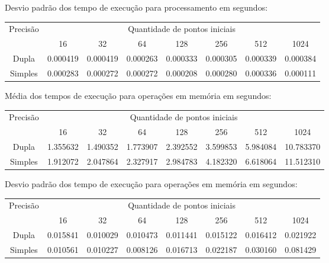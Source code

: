   \newpage
  \begin{small}
  \noindent Desvio padrão dos tempo de execução para processamento em segundos:\\
  \begin{tabular}{| c | c | c | c | c | c | c | c |}
    \hline
    \multirow{2}{*}{Precisão}& \multicolumn{7}{|c|}{Quantidade de pontos iniciais} \\ \cline{2-8}
    & 16 & 32 & 64 & 128 & 256 & 512 & 1024\\ \hline
    Dupla & 0.000419 & 0.000419 & 0.000263 & 0.000333 & 0.000305 & 0.000339 & 0.000384\\ \hline
    Simples & 0.000283 & 0.000272 & 0.000272 & 0.000208 & 0.000280 & 0.000336 & 0.000111\\ \hline

    \hline
  \end{tabular}
  \end{small}
  
  \hspace{1mm}\newline
  
  \begin{small}
  \noindent Média dos tempos de execução para operações em memória em segundos:\\
  \begin{tabular}{| c | c | c | c | c | c | c | c |}
    \hline
    \multirow{2}{*}{Precisão}& \multicolumn{7}{|c|}{Quantidade de pontos iniciais} \\ \cline{2-8}
    & 16 & 32 & 64 & 128 & 256 & 512 & 1024 \\ \hline
    Dupla & 1.355632 & 1.490352 & 1.773907 & 2.392552 & 3.599853 & 5.984084 & 10.783370\\ \hline
    Simples & 1.912072 & 2.047864 & 2.327917 & 2.984783 & 4.182320 & 6.618064 & 11.512310 \\ \hline
  \end{tabular}
  \end{small}
  
  \hspace{1mm}\newline
  
  \noindent Desvio padrão dos tempo de execução para operações em memória em segundos:\\
  \begin{tabular}{| c | c | c | c | c | c | c | c |}
    \hline
    \multirow{2}{*}{Precisão}& \multicolumn{7}{|c|}{Quantidade de pontos iniciais} \\ \cline{2-8}
    & 16 & 32 & 64 & 128 & 256 & 512 & 1024\\ \hline
    Dupla & 0.015841 & 0.010029 & 0.010473 & 0.011441 & 0.015122 & 0.016412 & 0.021922\\ \hline
    Simples & 0.010561 & 0.010227 & 0.008126 & 0.016713 & 0.022187 & 0.030160 & 0.081429\\ \hline
  \end{tabular}
  
